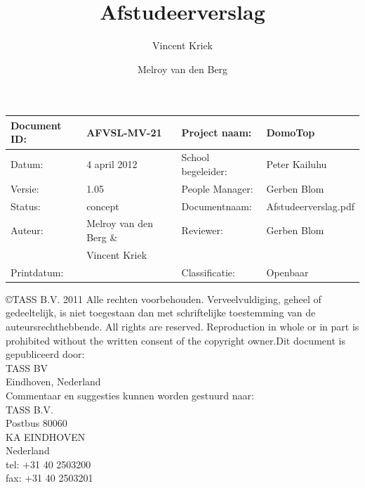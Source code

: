 \documentclass[]{article}
\makeatletter
\let\insertdate\@date
\newcommand{\version}{1.05}
\makeatother
\begin{document}
\title{Afstudeerverslag}
\author{Vincent Kriek \and Melroy van den Berg}

\maketitle

\vspace*{\fill}

\begin{tabular}{|| l | l || l | l ||}\hline
   Document ID: & AFVSL-MV-21          &Project naam:     &DomoTop             \\\hline
   Datum:       &4 april 2012          &School begeleider:&Peter Kailuhu       \\\hline
   Versie:      &\version              &People Manager:   &Gerben Blom         \\\hline
   Status:      &concept               &Documentnaam:     &Afstudeerverslag.pdf\\\hline
   Auteur:      &Melroy van den Berg \&&Reviewer:         &Gerben Blom         \\
                &Vincent Kriek         &                  &                    \\\hline
   Printdatum:  &\insertdate           &Classificatie:    &Openbaar            \\\hline
\end{tabular}

\newpage

\noindent\copyright  TASS B.V. 2011
Alle rechten voorbehouden. Verveelvuldiging, geheel of gedeeltelijk, is
niet toegestaan dan met schriftelijke toestemming van de
auteursrechthebbende.
All rights are reserved. Reproduction in whole or in part is prohibited
without the written consent of the copyright owner.Dit document is
gepubliceerd door:\\
TASS BV\\
Eindhoven, Nederland\\

\noindent Commentaar en suggesties kunnen worden gestuurd naar:\\
\indent TASS B.V.\\
\indent\indent Postbus 80060\\
\indent{} KA  EINDHOVEN\\
\indent\indent Nederland\\
\indent\indent tel:  +31 40 2503200\\
\indent\indent fax:  +31 40 2503201\\
\end{document}
